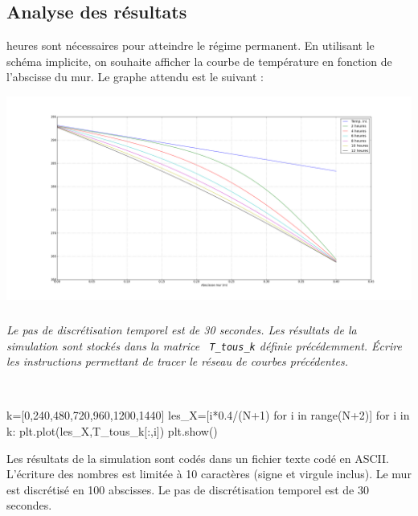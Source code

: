 \documentclass[10pt,fleqn]{article} %
\begin{document}
\begin{multicols}{2}
%


\section*{Analyse des résultats}
\ifprof
{} heures sont nécessaires pour atteindre le régime permanent. En utilisant le schéma implicite, on souhaite afficher la courbe de température en fonction de l'abscisse du mur. Le graphe attendu est le suivant :

\begin{center}
\includegraphics[width=\linewidth]{images/figure_04}
\end{center}

\fi

\subparagraph{}
\textit{Le pas de discrétisation temporel est de 30 secondes. Les résultats de la simulation sont stockés dans la matrice  \texttt{ T\_tous\_k}  définie précédemment. Écrire les instructions permettant de tracer le réseau de courbes précédentes.}
\ifprof

\begin{corrige}
~\\
\begin{python}
k=[0,240,480,720,960,1200,1440]
les_X=[i*0.4/(N+1) for i in range(N+2)]
for i in k:
    plt.plot(les_X,T_tous_k[:,i])
plt.show()
\end{python}
\end{corrige}
\else
\fi

\ifprof
\else
\vspace{.5cm}

Les résultats de la simulation sont codés dans un fichier texte codé en ASCII. L'écriture des nombres est limitée à 10 caractères (signe et virgule inclus). 
Le mur est discrétisé en 100 abscisses. Le pas de discrétisation temporel est de 30 secondes. 
\fi


\end{multicols}
\end{document}

